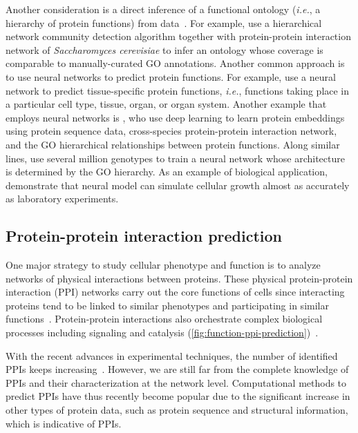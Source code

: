\documentclass[5p]{elsarticle}
\newcommand{\ie}{\emph{i.e.}\xspace}
\newcommand{\rev}[1]{{\color{black}#1}}
\begin{document}
Another consideration is a direct inference of a functional ontology (\ie, a hierarchy of protein functions) from data~\cite{Dutkowski2013gene,Mungall2012uberon}.
For example, \cite{Dutkowski2013gene} use a hierarchical network community detection algorithm together with protein-protein interaction network of {\em Saccharomyces cerevisiae} to infer an ontology whose coverage is comparable to \rev{manually-curated GO annotations.}
Another common approach is to use neural networks to predict protein functions.
For example, \cite{Zitnik2017ohmnet} use a neural network to predict tissue-specific protein functions, \ie, functions taking place in a particular cell type, tissue, organ, or organ system.
Another example that employs neural networks is \cite{Kulmanov2017deepgo}, who use deep learning to learn protein embeddings using protein sequence data, cross-species protein-protein interaction network, and the \rev{GO hierarchical relationships between protein functions.}
Along similar lines, \cite{Ma2018using} use several million genotypes to train a neural network whose architecture is determined by the \rev{GO hierarchy.}
As an example of biological application, \cite{Ma2018using} demonstrate that neural model can simulate cellular growth almost as accurately as laboratory experiments.

\subsection{Protein-protein interaction prediction}\label{sec:protein-protein-interaction-prediction}

One major strategy to study cellular phenotype and function is to analyze networks of physical interactions between proteins.
These physical protein-protein interaction (PPI) networks carry out the core functions of \rev{cells since} interacting proteins tend to be linked to similar phenotypes and participating in similar functions~\cite{Menche2015}.
Protein-protein interactions also orchestrate complex biological processes including signaling and catalysis (\autoref{fig:function-ppi-prediction})~\cite{Cowen2017network}.

With the recent advances in experimental techniques, the number of identified PPIs keeps increasing~\cite{Rolland2014proteome}.
However, we are still far from \rev{the complete} knowledge of PPIs and their characterization at the network level.
Computational methods to predict PPIs have thus recently become popular due to the significant increase in other types of protein data, such as protein sequence and structural information, which is indicative of PPIs.
\end{document}
